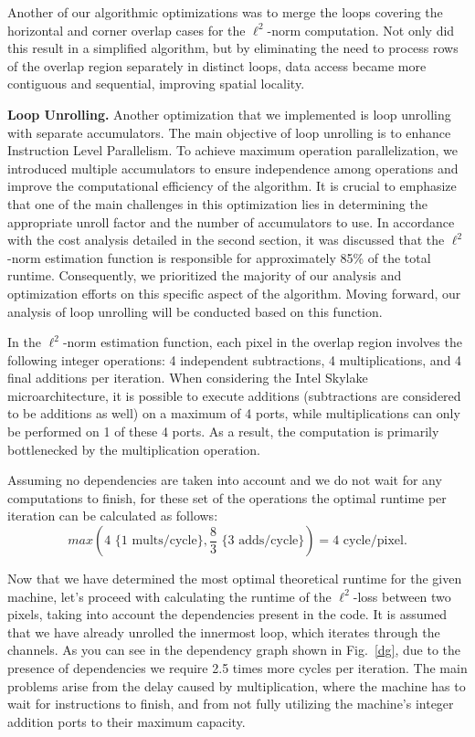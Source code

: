 \documentclass[letterpaper]{article}
\newcommand{\mypar}[1]{{\bf #1.}}
\begin{document}
Another of our algorithmic optimizations was to merge the loops covering the horizontal and corner overlap cases for the $\ell ^2$-norm computation. Not only did this result in a simplified algorithm, but by eliminating the need to process rows of the overlap region separately in distinct loops, data access became more contiguous and sequential, improving spatial locality.

\mypar{Loop Unrolling} 
Another optimization that we implemented is loop unrolling with separate accumulators. The main objective of loop unrolling is to enhance Instruction Level Parallelism. To achieve maximum operation parallelization, we introduced multiple accumulators to ensure independence among operations and improve the computational efficiency of the algorithm. It is crucial to emphasize that one of the main challenges in this optimization lies in determining the appropriate unroll factor and the number of accumulators to use. 
In accordance with the cost analysis detailed in the second section, it was discussed that the $\ell^2$-norm estimation function is responsible for approximately 85\% of the total runtime. Consequently, we prioritized the majority of our analysis and optimization efforts on this specific aspect of the algorithm. Moving forward, our analysis of loop unrolling will be conducted based on this function.

In the $\ell^2$-norm estimation function, each pixel in the overlap region involves the following integer operations: 4 independent subtractions, 4 multiplications, and 4 final additions per iteration. When considering the Intel Skylake microarchitecture, it is possible to execute additions (subtractions are considered to be additions as well) on a maximum of 4 ports, while multiplications can only be performed on 1 of these 4 ports. As a result, the computation is primarily bottlenecked by the multiplication operation.

Assuming no dependencies are taken into account and we do not wait for any computations to finish, for these set of the operations the optimal runtime per iteration can be calculated as follows:
\[ max(4 \text{ \{1 mults/cycle\}}, \frac{8}{3} \text{ \{3 adds/cycle\}}) = 4 \text{ cycle/pixel}. \]

Now that we have determined the most optimal theoretical runtime for the given machine, let's proceed with calculating the runtime of the $\ell^2$-loss between two pixels, taking into account the dependencies present in the code. It is assumed that we have already unrolled the innermost loop, which iterates through the channels. As you can see in the dependency graph shown in Fig.~\ref{dg}, due to the presence of dependencies we require 2.5 times more cycles per iteration. The main problems arise from the delay caused by multiplication, where the machine has to wait for instructions to finish, and from not fully utilizing the machine's integer addition ports to their maximum capacity.
\end{document}
